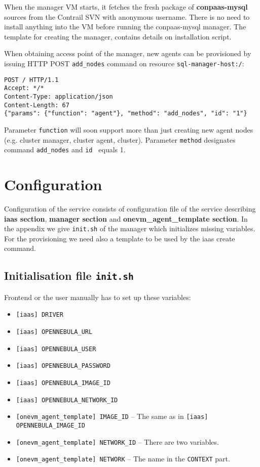 \documentclass[a4paper,10pt]{article}
\begin{document}
When the manager VM starts, it fetches the fresh package of {\bf conpaas-mysql} sources from the Contrail SVN with anonymous username. There is no need to install anything into the VM before running the conpaas-mysql manager. The template for creating the manager, contains details on installation script. 

When obtaining access point of the manager, new agents can be provisioned by issuing HTTP POST {\tt add\_nodes} command on resource {\tt sql-manager-host:/}:

\begin{verbatim}
POST / HTTP/1.1
Accept: */*
Content-Type: application/json
Content-Length: 67
{"params": {"function": "agent"}, "method": "add_nodes", "id": "1"}
\end{verbatim}

Parameter {\tt function} will soon support more than just creating new agent nodes (e.g. cluster manager, cluster agent, cluster). Parameter {\tt method} designates command {\tt add\_nodes} and {\tt id } equals 1. 

\section{Configuration}

Configuration of the service consists of configuration file of the service describing {\bf iaas section}, {\bf manager section} and {\bf onevm\_agent\_template section}. In the appendix we give {\tt init.sh} of the manager which initializes missing variables. For the provisioning we need also a template to be used by the iaas create command.

\subsection{Initialisation file {\tt init.sh}}

Frontend or the user manually has to set up these variables:

\begin{itemize}
	\item {\tt [iaas] DRIVER}
	\item {\tt [iaas] OPENNEBULA\_URL}	
	\item {\tt [iaas] OPENNEBULA\_USER}		
	\item {\tt [iaas] OPENNEBULA\_PASSWORD}			
	\item {\tt [iaas] OPENNEBULA\_IMAGE\_ID}				
	\item {\tt [iaas] OPENNEBULA\_NETWORK\_ID}
	\item {\tt [onevm\_agent\_template] IMAGE\_ID}  -- The same as in {\tt [iaas] OPENNEBULA\_IMAGE\_ID}
	\item {\tt [onevm\_agent\_template] NETWORK\_ID} --  There are two variables. 
	\item {\tt [onevm\_agent\_template] NETWORK} --  The name in the {\tt CONTEXT} part.
\end{itemize}
\end{document}
